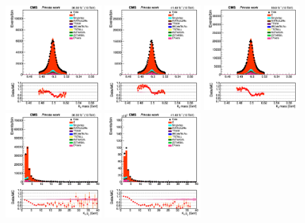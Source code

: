 \documentclass{cernatlasnote}
\begin{document}
   \begin{figure}[htp]
\centering
 \includegraphics[width=0.32\textwidth]{images/emu_channel/2016/16_Range_0pt7_1pt3/Reco_K0_mass_M_wind_Linear.png}
\includegraphics[width=0.32\textwidth]{images/emu_channel/2017/17_Range_0pt7_1pt3/Reco_K0_mass_M_wind_Linear.png}
 \includegraphics[width=0.32\textwidth]{images/emu_channel/2018/18_Range_0pt7_1pt3/Reco_K0_mass_M_wind_Linear.png}\\
 \includegraphics[width=0.32\textwidth]{images/emu_channel/2016/16_Range_0pt7_1pt3/Reco_K0_pt_M_wind_Linear.png}
\includegraphics[width=0.32\textwidth]{images/emu_channel/2017/17_Range_0pt7_1pt3/Reco_K0_pt_M_wind_Linear.png}

\end{figure}
\end{document}

